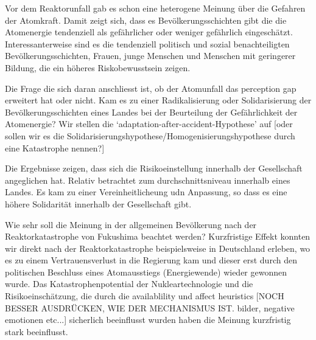 Vor dem Reaktorunfall gab es schon eine heterogene Meinung über die Gefahren der Atomkraft. Damit zeigt sich, dass es Bevölkerungsschichten gibt die die Atomenergie tendenziell als gefährlicher oder weniger gefährlich eingeschätzt.   
Interessanterweise sind es die tendenziell politisch und sozial benachteiligten Bevölkerungsschichten, Frauen, junge Menschen und Menschen mit geringerer Bildung, die ein höheres Riskobewusstsein zeigen. 

Die Frage die sich daran anschliesst ist, ob der Atomunfall das perception gap erweitert hat oder nicht. Kam es zu einer Radikalisierung oder Solidarisierung der Bevölkerungsschichten eines Landes bei der Beurteilung der Gefährlichkeit der Atomenergie? Wir stellen die `adaptation-after-accident-Hypothese' auf [oder sollen wir es die Solidarisierungshypothese/Homogenisierungshypothese durch eine Katastrophe nennen?]

Die Ergebnisse zeigen, dass sich die Risikoeinstellung innerhalb der Gesellschaft angeglichen hat. Relativ betrachtet zum durchschnittsniveau innerhalb eines Landes. Es kam zu einer Vereinheitlicheung udn Anpassung, so dass es eine höhere Solidarität innerhalb der Gesellschaft gibt. 


Wie sehr soll die Meinung in der allgemeinen Bevölkerung nach der Reaktorkatastrophe von Fukushima beachtet werden? Kurzfristige Effekt konnten wir direkt nach der Reaktorkatastrophe beispielsweise in Deutschland erleben, wo es zu einem Vertrauensverlust in die Regierung kam und dieser erst durch den politischen Beschluss eines Atomausstiegs (Energiewende) wieder gewonnen wurde. Das Katastrophenpotential der Nukleartechnologie und die Risikoeinschätzung, die durch die availablility und affect heuristics [NOCH BESSER AUSDRÜCKEN, WIE DER MECHANISMUS IST. bilder, negative emotionen etc...] sicherlich beeinflusst wurden haben die Meinung kurzfristig stark beeinflusst. 

